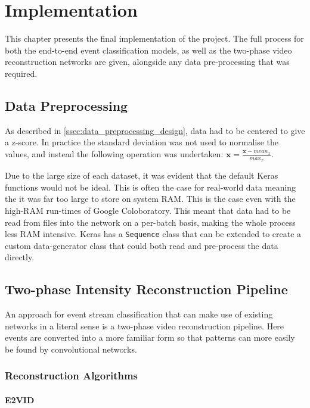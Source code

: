 \chapter{Implementation} \label{chap:implementation}

This chapter presents the final implementation of the project. The full process for both the end-to-end event classification models, as well as the two-phase video reconstruction networks are given, alongside any data pre-processing that was required.

\section{Data Preprocessing}

As described in  \cref{ssec:data_preprocessing_design}, data had to be centered to give a z-score. In practice the standard deviation was not used to normalise the values, and instead the following operation was undertaken: $ \textbf{x} = \frac{\textbf{x} - mean_x}{max_x} $. 

Due to the large size of each dataset, it was evident that the default Keras functions would not be ideal. This is often the case for real-world data meaning the it was far too large to store on system RAM. This is the case even with the high-RAM run-times of Google Coloboratory. This meant that data had to be read from files into the network on a per-batch basis, making the whole process less RAM intensive. Keras has a \lstinline{Sequence} class that can be extended to create a custom data-generator class that could both read and pre-process the data directly.

\section{Two-phase Intensity Reconstruction Pipeline}

An approach for event stream classification that can make use of existing networks in a literal sense is a two-phase video reconstruction pipeline. Here events are converted into a more familiar form so that patterns can more easily be found by convolutional networks.

\subsection{Reconstruction Algorithms}

\subsubsection{E2VID}

